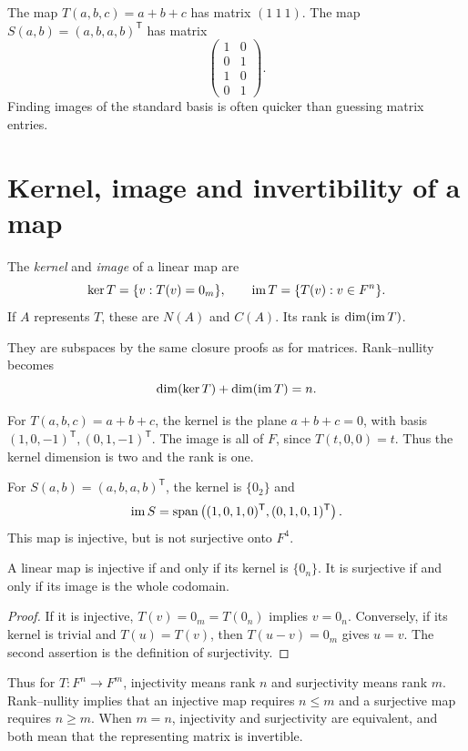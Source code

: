 \begin{example}
The map $T(a,b,c)=a+b+c$ has matrix $(1\ 1\ 1)$.
The map $S(a,b)=(a,b,a,b)^{\mathsf T}$ has matrix
\[
 \begin{pmatrix}1&0\\0&1\\1&0\\0&1\end{pmatrix}.
\]
Finding images of the standard basis is often quicker than guessing
matrix entries.
\end{example}

\section{Kernel, image and invertibility of a map}

\begin{definition}
The \emph{kernel} and \emph{image} of a linear map are
\[
 \ker T=\{v:T(v)=0_m\},\qquad
 \operatorname{im} T=\{T(v):v\in F^n\}.
\]
If $A$ represents $T$, these are $N(A)$ and $C(A)$.
Its rank is $\dim(\operatorname{im} T)$.
\end{definition}

They are subspaces by the same closure proofs as for matrices.
Rank--nullity becomes
\[
 \dim(\ker T)+\dim(\operatorname{im} T)=n.
\]

\begin{example}
For $T(a,b,c)=a+b+c$, the kernel is the plane $a+b+c=0$,
with basis $(1,0,-1)^{\mathsf T},(0,1,-1)^{\mathsf T}$.
The image is all of $F$, since $T(t,0,0)=t$.
Thus the kernel dimension is two and the rank is one.

For $S(a,b)=(a,b,a,b)^{\mathsf T}$, the kernel is $\{0_2\}$ and
\[
 \operatorname{im} S=\operatorname{span}\left(
 (1,0,1,0)^{\mathsf T},(0,1,0,1)^{\mathsf T}\right).
\]
This map is injective, but is not surjective onto $F^4$.
\end{example}

\begin{proposition}
A linear map is injective if and only if its kernel is $\{0_n\}$.
It is surjective if and only if its image is the whole codomain.
\end{proposition}
\begin{proof}
If it is injective, $T(v)=0_m=T(0_n)$ implies $v=0_n$.
Conversely, if its kernel is trivial and $T(u)=T(v)$, then
$T(u-v)=0_m$ gives $u=v$.
The second assertion is the definition of surjectivity.
\end{proof}

Thus for $T:F^n\to F^m$, injectivity means rank $n$ and surjectivity
means rank $m$. Rank--nullity implies that an injective map requires
$n\leq m$ and a surjective map requires $n\geq m$.
When $m=n$, injectivity and surjectivity are equivalent, and both mean
that the representing matrix is invertible.

